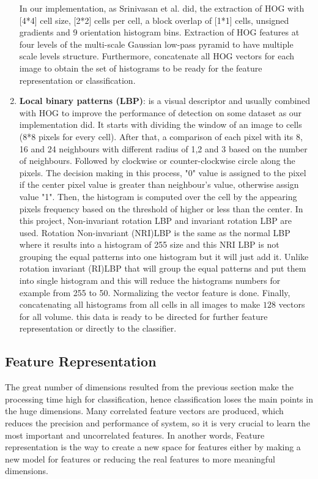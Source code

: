 \begin{enumerate}
In our implementation, as Srinivasan et al. did, the extraction of HOG with [4*4] cell size, [2*2] cells per cell, a block overlap of [1*1] cells, unsigned gradients and 9 orientation histogram bins.
Extraction of HOG features at four levels of the multi-scale Gaussian low-pass pyramid to have multiple scale levels structure.
Furthermore, concatenate all HOG vectors for each image to obtain the set of histograms to be ready for the feature representation or classification.  
\item \textbf{Local binary patterns (LBP)}: is a visual descriptor and usually combined with HOG to improve the performance of detection on some dataset as our implementation did.
It starts with dividing the window of an image to cells (8*8 pixels for every cell).
After that, a comparison of each pixel with its 8, 16 and 24 neighbours with different radius of 1,2 and 3 based on the number of neighbours.
Followed by clockwise or counter-clockwise circle along the pixels.
The decision making in this process, "0" value is assigned to the pixel if the center pixel value is greater than neighbour’s value, otherwise assign value "1".
Then, the histogram is computed over the cell by the appearing pixels frequency based on the threshold of higher or less than the center.
In this project, Non-invariant rotation LBP and invariant rotation LBP are used.
Rotation Non-invariant (NRI)LBP is the same as the normal LBP where it results into a histogram of 255 size and this NRI LBP is not grouping the equal patterns into one histogram but it will just add it.
Unlike rotation invariant (RI)LBP that will group the equal patterns and put them into single histogram and this will reduce the histograms numbers for example from 255 to 50. 
Normalizing the vector feature is done.
Finally, concatenating all histograms from all cells in all images to make $128$ vectors for all volume.
this data is ready to be directed for further feature representation or directly to the classifier.
\end{enumerate} 

\subsection{Feature Representation}
The great number of dimensions resulted from the previous section make the processing time high for classification, hence classification loses the main points in the huge dimensions.
Many correlated feature vectors are produced, which reduces the precision and performance of system, so it is very crucial to learn the most important and uncorrelated features.
In another words, Feature representation is the way to create a new space for features either by making a new model for features or reducing the real features to more meaningful dimensions. 

